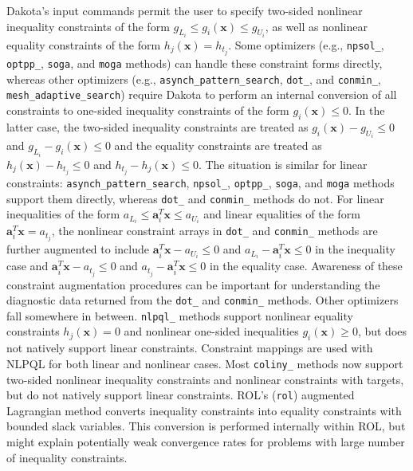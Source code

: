 Dakota's input commands permit the user to specify two-sided nonlinear
inequality constraints of the form $g_{L_{i}} \leq g_{i}(\mathbf{x})
\leq g_{U_{i}}$, as well as nonlinear equality constraints of the form
$h_{j}(\mathbf{x}) = h_{t_{j}}$. Some optimizers (e.g.,
\texttt{npsol\_}, \texttt{optpp\_}, \texttt{soga}, and \texttt{moga}
methods) can handle these constraint forms directly, whereas other
optimizers (e.g., \texttt{asynch\_pattern\_search}, \texttt{dot\_},
and \texttt{conmin\_}, \texttt{mesh\_adaptive\_search}) require Dakota
to perform an internal conversion of all constraints to one-sided
inequality constraints of the form $g_{i}(\mathbf{x}) \leq 0$. In the
latter case, the two-sided inequality constraints are treated as
$g_{i}(\mathbf{x}) - g_{U_{i}} \leq 0$ and $g_{L_{i}} -
g_{i}(\mathbf{x}) \leq 0$ and the equality constraints are treated as
$h_{j}(\mathbf{x}) - h_{t_{j}} \leq 0$ and $h_{t_{j}} -
h_{j}(\mathbf{x}) \leq 0$. The situation is similar for linear
constraints: \texttt{asynch\_pattern\_search}, \texttt{npsol\_},
\texttt{optpp\_}, \texttt{soga}, and \texttt{moga} methods support
them directly, whereas \texttt{dot\_} and \texttt{conmin\_} methods do
not. For linear inequalities of the form $a_{L_{i}} \leq
\mathbf{a}_{i}^{T}\mathbf{x} \leq a_{U_{i}}$ and linear equalities of
the form $\mathbf{a}_{i}^{T}\mathbf{x} = a_{t_{j}}$, the nonlinear
constraint arrays in \texttt{dot\_} and \texttt{conmin\_} methods are
further augmented to include $\mathbf{a}_{i}^{T}\mathbf{x} - a_{U_{i}}
\leq 0$ and $a_{L_{i}} - \mathbf{a}_{i}^{T}\mathbf{x} \leq 0$ in the
inequality case and $\mathbf{a}_{i}^{T}\mathbf{x} - a_{t_{j}} \leq 0$
and $a_{t_{j}} - \mathbf{a}_{i}^{T}\mathbf{x} \leq 0$ in the equality
case. Awareness of these constraint augmentation procedures can be
important for understanding the diagnostic data returned from the
\texttt{dot\_} and \texttt{conmin\_} methods. Other optimizers fall
somewhere in between.  \texttt{nlpql\_} methods support nonlinear
equality constraints $h_{j}(\mathbf{x}) = 0$ and nonlinear one-sided
inequalities $g_{i}(\mathbf{x}) \geq 0$, but does not natively support
linear constraints. Constraint mappings are used with NLPQL for both
linear and nonlinear cases. Most \texttt{coliny\_} methods now support
two-sided nonlinear inequality constraints and nonlinear constraints
with targets, but do not natively support linear constraints. ROL's 
(\texttt{rol}) augmented Lagrangian method converts inequality 
constraints into equality constraints with bounded slack variables. 
This conversion is performed internally within ROL, but might explain 
potentially weak convergence rates for problems with large number of 
inequality constraints.

